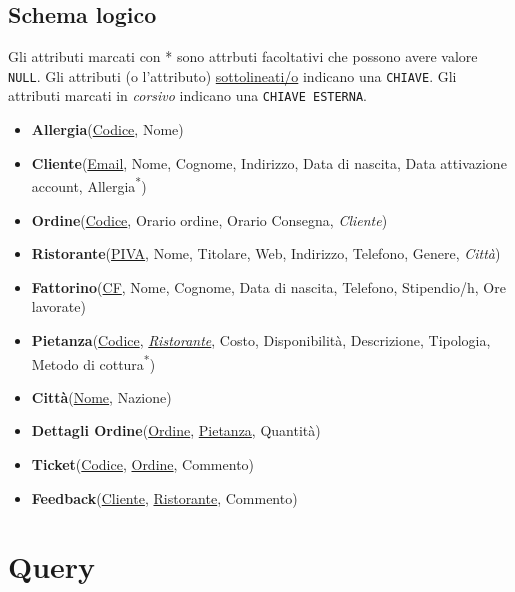\documentclass[10pt]{article}
\begin{document}
		\subsection{Schema logico}
		\begin{framed}
		\noindent Gli attributi marcati con * sono attrbuti facoltativi che possono avere valore \texttt{\color{blue}NULL}. \newline
		Gli attributi (o l'attributo) \underline{sottolineati/o} indicano una \texttt{CHIAVE}. \newline
		Gli attributi marcati in \textit{corsivo} indicano una \texttt{CHIAVE ESTERNA}.
		\end{framed}
		\begin{itemize}[noitemsep]
			\item[] \textbf{Allergia}(\underline{Codice}, Nome)
			\item[] \textbf{Cliente}(\underline{Email}, Nome, Cognome, Indirizzo, Data di nascita, Data attivazione account, Allergia\textsuperscript{*})
			\item[] \textbf{Ordine}(\underline{Codice}, Orario ordine, Orario Consegna, \textit{Cliente})
			\item[] \textbf{Ristorante}(\underline{PIVA}, Nome, Titolare, Web, Indirizzo, Telefono, Genere, \textit{Città})
			\item[] \textbf{Fattorino}(\underline{CF}, Nome, Cognome, Data di nascita, Telefono, Stipendio/h, Ore lavorate)			
			\item[] \textbf{Pietanza}(\underline{Codice}, \underline{\textit{Ristorante}}, Costo, Disponibilità, Descrizione, Tipologia, Metodo di cottura\textsuperscript{*})
			\item[] \textbf{Città}(\underline{Nome}, Nazione)
			\item[] \textbf{Dettagli Ordine}(\underline{Ordine}, \underline{Pietanza}, Quantità)
			\item[] \textbf{Ticket}(\underline{Codice}, \underline{Ordine}, Commento)
			\item[] \textbf{Feedback}(\underline{Cliente}, \underline{Ristorante}, Commento)
			
		\end{itemize}
	\section{Query}
\end{document}

